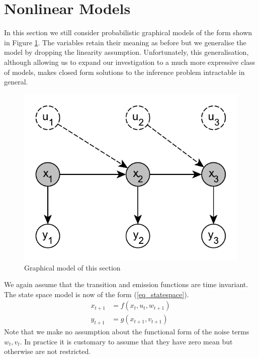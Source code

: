 \documentclass[../masters.tex]{subfiles}
\begin{document}
\graphicspath{{./imgs/}{../imgs/}} %

\section{Nonlinear Models}
In this section we still consider probabilistic graphical models of the form shown in Figure \ref{fig_linmod}. The variables retain their meaning as before but we generalise the model by dropping the linearity assumption. Unfortunately, this generalisation, although allowing us to expand our investigation to a much more expressive class of models, makes closed form solutions to the inference problem intractable in general.   
\begin{figure}[H] 
\centering
\includegraphics[scale=1.0]{linear_model.pdf}
\caption{Graphical model of this section}
\label{fig_linmod}
\end{figure}
We again assume that the transition and emission functions are time invariant. The state space model is now of the form (\ref{eq_statespace}).
\begin{equation}
\begin{aligned}
x_{t+1} &= f(x_t, u_t, w_{t+1}) \\
y_{t+1} &= g(x_{t+1}, v_{t+1})
\end{aligned}
\label{eq_statespace}
\end{equation}
Note that we make no assumption about the functional form of the noise terms $w_t,v_t$. In practice it is customary to assume that they have zero mean but otherwise are not restricted.
\end{document}
